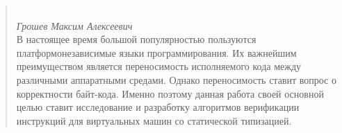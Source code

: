 \begin{abstract}

    \begin{center}
        \large{} \\
    \large\textit{Грошев Максим Алексеевич} \\[1 cm]

    В настоящее время большой популярностью пользуются платформонезависимые языки программирования. 
    Их важнейшим преимуществом является переносимость исполняемого кода между различными аппаратными средами. 
    Однако переносимость ставит вопрос о корректности байт-кода. 
    Именно поэтому данная работа своей основной целью ставит исследование и разработку алгоритмов верификации инструкций для
    виртуальных машин со статической типизацией.
    \vfill
    \end{center}

\end{abstract}
